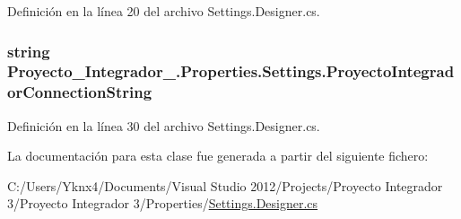 Definición en la línea 20 del archivo Settings.\-Designer.\-cs.

\hypertarget{class_proyecto___integrador__3_1_1_properties_1_1_settings_a93d1b331cecd6df496d20e46ec32450d}{
\subsubsection[{Proyecto\-Integrador\-Connection\-String}]{\setlength{\rightskip}{0pt plus 5cm}string Proyecto\-\_\-\-Integrador\-\_.\-Properties.\-Settings.\-Proyecto\-Integrador\-Connection\-String\hspace{0.3cm}{\ttfamily [get]}}}\label{class_proyecto___integrador__3_1_1_properties_1_1_settings_a93d1b331cecd6df496d20e46ec32450d}


Definición en la línea 30 del archivo Settings.\-Designer.\-cs.



La documentación para esta clase fue generada a partir del siguiente fichero\-:\begin{DoxyCompactItemize}
\item 
C\-:/\-Users/\-Yknx4/\-Documents/\-Visual Studio 2012/\-Projects/\-Proyecto Integrador 3/\-Proyecto Integrador 3/\-Properties/\hyperlink{_settings_8_designer_8cs}{Settings.\-Designer.\-cs}\end{DoxyCompactItemize}
